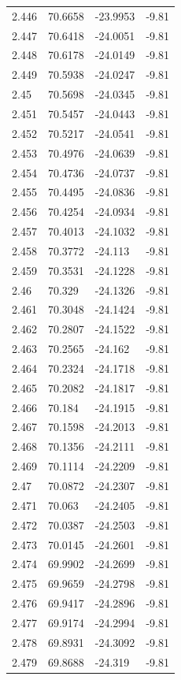 \begin{tabular}{llll}
2.446 & 70.6658 & -23.9953 & -9.81 \\
2.447 & 70.6418 & -24.0051 & -9.81 \\
2.448 & 70.6178 & -24.0149 & -9.81 \\
2.449 & 70.5938 & -24.0247 & -9.81 \\
2.45 & 70.5698 & -24.0345 & -9.81 \\
2.451 & 70.5457 & -24.0443 & -9.81 \\
2.452 & 70.5217 & -24.0541 & -9.81 \\
2.453 & 70.4976 & -24.0639 & -9.81 \\
2.454 & 70.4736 & -24.0737 & -9.81 \\
2.455 & 70.4495 & -24.0836 & -9.81 \\
2.456 & 70.4254 & -24.0934 & -9.81 \\
2.457 & 70.4013 & -24.1032 & -9.81 \\
2.458 & 70.3772 & -24.113 & -9.81 \\
2.459 & 70.3531 & -24.1228 & -9.81 \\
2.46 & 70.329 & -24.1326 & -9.81 \\
2.461 & 70.3048 & -24.1424 & -9.81 \\
2.462 & 70.2807 & -24.1522 & -9.81 \\
2.463 & 70.2565 & -24.162 & -9.81 \\
2.464 & 70.2324 & -24.1718 & -9.81 \\
2.465 & 70.2082 & -24.1817 & -9.81 \\
2.466 & 70.184 & -24.1915 & -9.81 \\
2.467 & 70.1598 & -24.2013 & -9.81 \\
2.468 & 70.1356 & -24.2111 & -9.81 \\
2.469 & 70.1114 & -24.2209 & -9.81 \\
2.47 & 70.0872 & -24.2307 & -9.81 \\
2.471 & 70.063 & -24.2405 & -9.81 \\
2.472 & 70.0387 & -24.2503 & -9.81 \\
2.473 & 70.0145 & -24.2601 & -9.81 \\
2.474 & 69.9902 & -24.2699 & -9.81 \\
2.475 & 69.9659 & -24.2798 & -9.81 \\
2.476 & 69.9417 & -24.2896 & -9.81 \\
2.477 & 69.9174 & -24.2994 & -9.81 \\
2.478 & 69.8931 & -24.3092 & -9.81 \\
2.479 & 69.8688 & -24.319 & -9.81 \\

\end{tabular}
